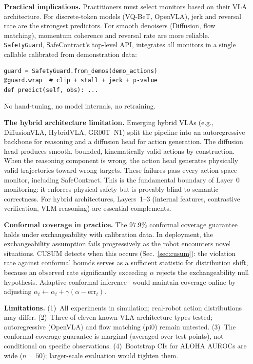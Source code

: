 \documentclass[conference]{IEEEtran}
\begin{document}
\textbf{Practical implications.}
Practitioners must select monitors based on their VLA architecture.
For discrete-token models (VQ-BeT, OpenVLA), jerk and reversal rate are the strongest predictors.
For smooth denoisers (Diffusion, flow matching), momentum coherence and reversal rate are more reliable.
\texttt{SafetyGuard}, SafeContract's top-level API, integrates all monitors in a single callable calibrated from demonstration data:

{\small
\begin{verbatim}
guard = SafetyGuard.from_demos(demo_actions)
@guard.wrap  # clip + stall + jerk + p-value
def predict(self, obs): ...
\end{verbatim}
}
\vspace{-2mm}
\noindent No hand-tuning, no model internals, no retraining.

\textbf{The hybrid architecture limitation.}
Emerging hybrid VLAs (e.g., DiffusionVLA, HybridVLA, GR00T~N1) split the pipeline into an autoregressive backbone for reasoning and a diffusion head for action generation.
The diffusion head produces smooth, bounded, kinematically valid actions by construction.
When the reasoning component is wrong, the action head generates physically valid trajectories toward wrong targets.
These failures pass every action-space monitor, including SafeContract.
This is the fundamental boundary of Layer~0 monitoring: it enforces physical safety but is provably blind to semantic correctness.
For hybrid architectures, Layers~1--3 (internal features, contrastive verification, VLM reasoning) are essential complements.

\textbf{Conformal coverage in practice.}
The 97.9\% conformal coverage guarantee holds under exchangeability with calibration data.
In deployment, the exchangeability assumption fails progressively as the robot encounters novel situations.
CUSUM detects when this occurs (Sec.~\ref{sec:cusum}): the violation rate against conformal bounds serves as a sufficient statistic for distribution shift, because an observed rate significantly exceeding $\alpha$ rejects the exchangeability null hypothesis.
Adaptive conformal inference~\cite{gibbs2021} would maintain coverage online by adjusting $\alpha_t \leftarrow \alpha_t + \gamma(\alpha - \text{err}_t)$.

\textbf{Limitations.}
(1)~All experiments in simulation; real-robot action distributions may differ.
(2)~Three of eleven known VLA architecture types tested; autoregressive (OpenVLA) and flow matching (pi0) remain untested.
(3)~The conformal coverage guarantee is marginal (averaged over test points), not conditional on specific observations.
(4)~Bootstrap CIs for ALOHA AUROCs are wide ($n{=}50$); larger-scale evaluation would tighten them.
\end{document}
